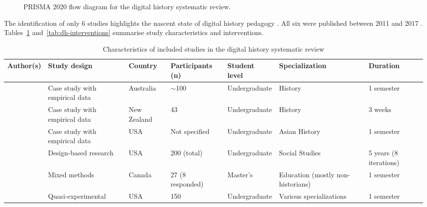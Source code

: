 \begin{figure}[!h]
\centering
\resizebox{\textwidth}{!}{}
\caption{PRISMA 2020 flow diagram for the digital history systematic review.}
\label{fig:dh-prisma}
\end{figure}

The identification of only 6 studies highlights the nascent state of digital history pedagogy \cite{KorniienkoSemerikov2024}. All six were published between 2011 and 2017 \cite{Bell2016, Coleborne2011, Davis2017, Lee2014159, McLean20144, Soh2013}. Tables~\ref{tab:dh-characteristics} and~\ref{tab:dh-interventions} summarise study characteristics and interventions.

\begin{table}[!h]
\centering
\caption{Characteristics of included studies in the digital history systematic review \citep{Korniienko2025cte}}
\label{tab:dh-characteristics}
\footnotesize
\begin{tabularx}{\textwidth}{X X X X X X X}
\hline
\textbf{Author(s)} & \textbf{Study design} & \textbf{Country} & \textbf{Participants (n)} & \textbf{Student level} & \textbf{Specialization} & \textbf{Duration} \\
\hline
\citet{Bell2016} & Case study with empirical data & Australia & $\sim$100 & Undergraduate & History & 1 semester \\
\hline
\citet{Coleborne2011} & Case study with empirical data & New Zealand & 43 & Undergraduate & History & 3 weeks \\
\hline
\citet{Davis2017} & Case study with empirical data & USA & Not specified & Undergraduate & Asian History & 1 semester \\
\hline
\citet{Lee2014159} & Design-based research & USA & 200 (total) & Undergraduate & Social Studies & 5 years (8 iterations) \\
\hline
\citet{McLean20144} & Mixed methods & Canada & 27 (8 responded) & Master's & Education (mostly non-historians) & 1 semester \\
\hline
\citet{Soh2013} & Quasi-experimental & USA & 150 & Undergraduate & Various specializations & 1 semester \\
\hline
\end{tabularx}
\end{table}

